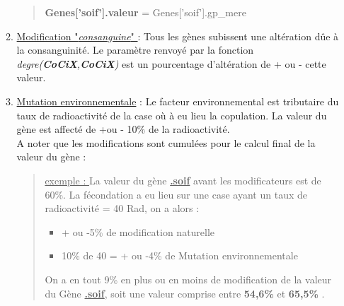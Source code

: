 \documentclass[french]{report}
\begin{document}
\begin{itemize}
\begin{enumerate}
\begin{quote}
			\textbf{Genes['soif'].valeur} = Genes['soif'].gp\_mere\\
			
		\end{quote}
		\item \underline{Modification "\textit{consanguine}" } : Tous les gènes subissent une altération dûe à la consanguinité. Le paramètre renvoyé par la fonction \textit{degre(\textbf{CoCiX},\textbf{CoCiX})} est un pourcentage d'altération  de + ou - cette valeur.\\
		
		\item \underline{Mutation environnementale} : Le facteur environnemental est tributaire du taux de radioactivité de la case où à eu lieu la copulation. La valeur du gène est affecté de +ou - 10\% de la radioactivité.\\
		
		A noter que les modifications sont cumulées pour le calcul final de la valeur du gène :\\
		\begin{quote}
			\underline{exemple : }
			La valeur du gène \underline{\textbf{.soif}} avant les modificateurs est de 60\%. La fécondation a eu lieu sur une case ayant un taux de radioactivité = 40 Rad, on a alors :\\
			\begin{itemize}
				\item + ou -5\% de modification naturelle\\
				\item 10\% de 40 =  + ou -4\% de Mutation environnementale\\
			\end{itemize}
			On a en tout 9\% en plus ou en moins de modification de la valeur du Gène \textbf{\underline{.soif}}, soit une valeur comprise entre \textbf{54,6\% }et \textbf{65,5\%} .\\
			

\end{quote}
\end{enumerate}
\end{itemize}
\end{document}
